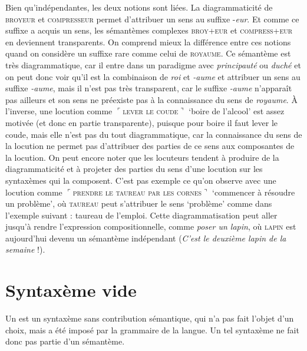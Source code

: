 Bien qu’indépendantes, les deux notions sont liées. La diagrammaticité de \textsc{broyeur} et \textsc{compresseur} permet d’attribuer un sens au suffixe -\textit{eur}. Et comme ce suffixe a acquis un sens, les sémantèmes complexes \textsc{broy+eur} et \textsc{compress+eur} en deviennent transparents. On comprend mieux la différence entre ces notions quand on considère un suffixe rare comme celui de \textsc{royaume}. Ce sémantème est très diagrammatique, car il entre dans un paradigme avec \textit{principauté} ou \textit{duché} et on peut donc voir qu’il est la combinaison de \textit{roi} et \textit{{}-aume} et attribuer un sens au suffixe \textit{{}-aume}, mais il n’est pas très transparent, car le suffixe \textit{{}-aume} n’apparaît pas ailleurs et son sens ne préexiste pas à la connaissance du sens de \textit{royaume}. À l’inverse, une locution comme $⌜$\textsc{lever} \textsc{le} \textsc{coude}$⌝$ ‘boire de l’alcool’ est assez motivée (et donc en partie transparente), puisque pour boire il faut lever le coude, mais elle n’est pas du tout diagrammatique, car la connaissance du sens de la locution ne permet pas d’attribuer des parties de ce sens aux composantes de la locution. On peut encore noter que les locuteurs tendent à produire de la diagrammaticité et à projeter des parties du sens d’une locution sur les syntaxèmes qui la composent. C’est pas exemple ce qu’on observe avec une locution comme $⌜$\textsc{prendre} \textsc{le} \textsc{taureau} \textsc{par} \textsc{les} \textsc{cornes}$⌝$ ‘commencer à résoudre un problème’, où \textsc{taureau} peut s’attribuer le sens ‘problème’ comme dans l’exemple suivant :  taureau de l’emploi. Cette diagrammatisation peut aller jusqu’à rendre l’expression compositionnelle, comme \textit{poser un lapin}, où \textsc{lapin} est aujourd’hui devenu un sémantème indépendant (\textit{C’est le deuxième lapin de la semaine} !).

\section{Syntaxème vide}\label{sec:2.3.3}

\begin{styleLivreImportant}
Un  est un syntaxème sans contribution sémantique, qui n’a pas fait l’objet d’un choix, mais a été imposé par la grammaire de la langue. Un tel syntaxème ne fait donc pas partie d’un sémantème.
\end{styleLivreImportant}

